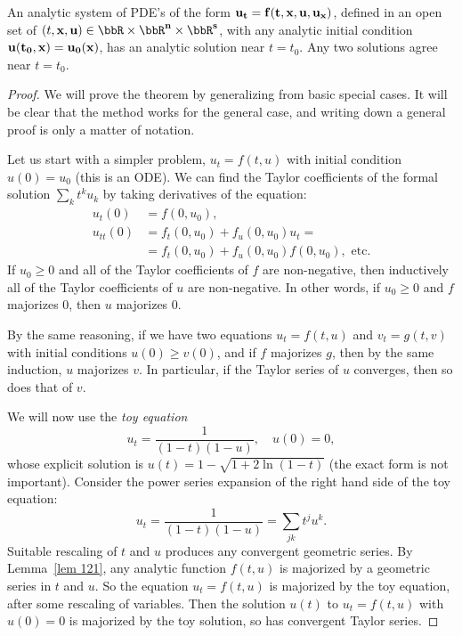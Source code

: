 \begin{thm}
    An analytic system of PDE's of the form $\bf{u}_t=\bf{f}(t,\bf{x},\bf{u},\bf{u}_{\bf x})$, defined in an open set of $(t,\bf{x},\bf{u})\in \bbR\times\bbR^n\times\bbR^s$, with any analytic initial condition $\bf{u}(t_0,\bf{x})=\bf{u}_0(\bf{x})$, has an analytic solution near $t=t_0$. Any two solutions agree near $t=t_0$.
\end{thm}
\begin{proof}
    We will prove the theorem by generalizing from basic special cases. It will be clear that the method works for the general case, and writing down a general proof is only a matter of notation.

    Let us start with a simpler problem, $u_t=f(t,u)$ with initial condition $u(0)=u_0$ (this is an ODE). We can find the Taylor coefficients of the formal solution $\sum_k t^k u_k$ by taking derivatives of the equation:
    \begin{align}
        u_t(0)&=f(0,u_0),\\
        u_{tt}(0)&=f_t(0,u_0)+f_u(0,u_0)u_t=\\
                 &=f_t(0,u_0)+f_u(0,u_0)f(0,u_0),\text{ etc.}
    \end{align}
    If $u_0\geq 0$ and all of the Taylor coefficients of $f$ are non-negative, then inductively all of the Taylor coefficients of $u$ are non-negative. In other words, if $u_0\geq 0$ and $f$ majorizes $0$, then $u$ majorizes $0$.

    By the same reasoning, if we have two equations $u_t=f(t,u)$ and $v_t=g(t,v)$ with initial conditions $u(0)\geq v(0)$, and if $f$ majorizes $g$, then by the same induction, $u$ majorizes $v$. In particular, if the Taylor series of $u$ converges, then so does that of $v$.

    We will now use the \emph{toy equation} 
    \[u_t=\frac{1}{(1-t)(1-u)},\quad u(0)=0,\]
    whose explicit solution is $u(t)=1-\sqrt{1+2\ln(1-t)}$ (the exact form is not important).
    Consider the power series expansion of the right hand side of the toy equation:
    \[
        u_t=\frac{1}{(1-t)(1-u)}=\sum_{jk}t^j u^k.
    \]
    Suitable rescaling of $t$ and $u$ produces any convergent geometric series. By Lemma~\ref{lem 121}, any analytic function $f(t,u)$ is majorized by a geometric series in $t$ and $u$. So the equation $u_t=f(t,u)$ is majorized by the toy equation, after some rescaling of variables. Then the solution $u(t)$ to $u_t=f(t,u)$ with $u(0)=0$ is majorized by the toy solution, so has convergent Taylor series.


\end{proof}
